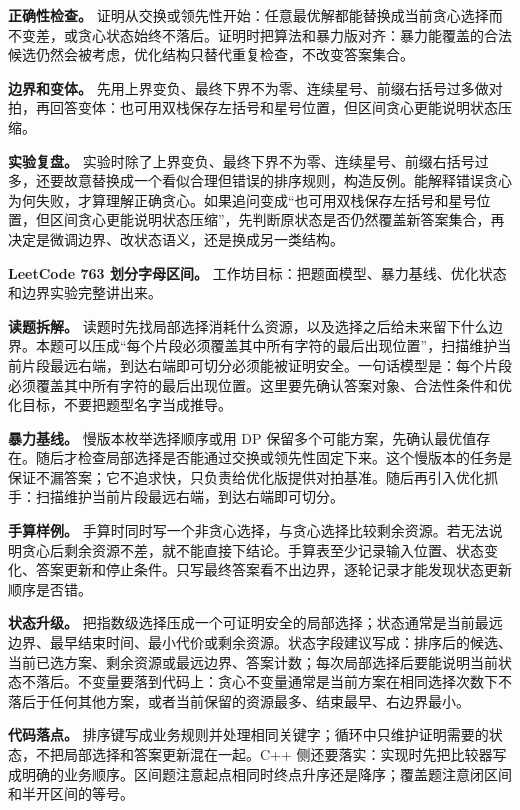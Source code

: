 \textbf{正确性检查。} 证明从交换或领先性开始：任意最优解都能替换成当前贪心选择而不变差，或贪心状态始终不落后。证明时把算法和暴力版对齐：暴力能覆盖的合法候选仍然会被考虑，优化结构只替代重复检查，不改变答案集合。

\textbf{边界和变体。} 先用上界变负、最终下界不为零、连续星号、前缀右括号过多做对拍，再回答变体：也可用双栈保存左括号和星号位置，但区间贪心更能说明状态压缩。

\textbf{实验复盘。} 实验时除了上界变负、最终下界不为零、连续星号、前缀右括号过多，还要故意替换成一个看似合理但错误的排序规则，构造反例。能解释错误贪心为何失败，才算理解正确贪心。如果追问变成“也可用双栈保存左括号和星号位置，但区间贪心更能说明状态压缩”，先判断原状态是否仍然覆盖新答案集合，再决定是微调边界、改状态语义，还是换成另一类结构。

\noindent\textbf{LeetCode 763 划分字母区间。} 工作坊目标：把题面模型、暴力基线、优化状态和边界实验完整讲出来。

\textbf{读题拆解。} 读题时先找局部选择消耗什么资源，以及选择之后给未来留下什么边界。本题可以压成“每个片段必须覆盖其中所有字符的最后出现位置”，扫描维护当前片段最远右端，到达右端即可切分必须能被证明安全。一句话模型是：每个片段必须覆盖其中所有字符的最后出现位置。这里要先确认答案对象、合法性条件和优化目标，不要把题型名字当成推导。

\textbf{暴力基线。} 慢版本枚举选择顺序或用 DP 保留多个可能方案，先确认最优值存在。随后才检查局部选择是否能通过交换或领先性固定下来。这个慢版本的任务是保证不漏答案；它不追求快，只负责给优化版提供对拍基准。随后再引入优化抓手：扫描维护当前片段最远右端，到达右端即可切分。

\textbf{手算样例。} 手算时同时写一个非贪心选择，与贪心选择比较剩余资源。若无法说明贪心后剩余资源不差，就不能直接下结论。手算表至少记录输入位置、状态变化、答案更新和停止条件。只写最终答案看不出边界，逐轮记录才能发现状态更新顺序是否错。

\textbf{状态升级。} 把指数级选择压成一个可证明安全的局部选择；状态通常是当前最远边界、最早结束时间、最小代价或剩余资源。状态字段建议写成：排序后的候选、当前已选方案、剩余资源或最远边界、答案计数；每次局部选择后要能说明当前状态不落后。不变量要落到代码上：贪心不变量通常是当前方案在相同选择次数下不落后于任何其他方案，或者当前保留的资源最多、结束最早、右边界最小。

\textbf{代码落点。} 排序键写成业务规则并处理相同关键字；循环中只维护证明需要的状态，不把局部选择和答案更新混在一起。C++ 侧还要落实：实现时先把比较器写成明确的业务顺序。区间题注意起点相同时终点升序还是降序；覆盖题注意闭区间和半开区间的等号。

